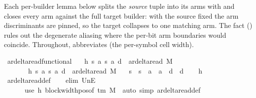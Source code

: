 \begin{isabellebody}
\begin{isamarkuptext}
  Each per-builder lemma below splits the \emph{source} tuple into its
  arms with  and closes every arm against the full target
  builder: with the source fixed the arm discriminants are pinned, so the
  target collapses to one matching arm.  The  fact
  () rules out the degenerate 
  aliasing where the per-bit arm boundaries would coincide.
  Throughout,  abbreviates  (the per-symbol cell width).%
\end{isamarkuptext}\isamarkuptrue%
\isamarkupfalse%
\ ar{\isacharunderscore}{\kern0pt}delta{\isacharunderscore}{\kern0pt}read{\isacharunderscore}{\kern0pt}functional{\isacharcolon}{\kern0pt}\isanewline
\ \ \ h{}{\isacharcolon}{\kern0pt}\ {\isachardoublequoteopen}{\isacharparenleft}{\kern0pt}s{\isacharcomma}{\kern0pt}\ a{\isacharcomma}{\kern0pt}\ s{}{\isacharcomma}{\kern0pt}\ a{}{\isacharcomma}{\kern0pt}\ d{}{\isacharparenright}{\kern0pt}\ {\isasymin}\ ar{\isacharunderscore}{\kern0pt}delta{\isacharunderscore}{\kern0pt}read\ M{\isachardoublequoteclose}\isanewline
\ \ \ \ \ \ \ h{}{\isacharcolon}{\kern0pt}\ {\isachardoublequoteopen}{\isacharparenleft}{\kern0pt}s{\isacharcomma}{\kern0pt}\ a{\isacharcomma}{\kern0pt}\ s{}{\isacharcomma}{\kern0pt}\ a{}{\isacharcomma}{\kern0pt}\ d{}{\isacharparenright}{\kern0pt}\ {\isasymin}\ ar{\isacharunderscore}{\kern0pt}delta{\isacharunderscore}{\kern0pt}read\ M{\isachardoublequoteclose}\isanewline
\ \ \ {\isachardoublequoteopen}s{}\ {\isacharequal}{\kern0pt}\ s{}\ {\isasymand}\ a{}\ {\isacharequal}{\kern0pt}\ a{}\ {\isasymand}\ d{}\ {\isacharequal}{\kern0pt}\ d{}{\isachardoublequoteclose}\isanewline
%
\isadelimproof
\ \ %
\endisadelimproof
%
\isatagproof
{}\isamarkupfalse%
\ h{}\ \isamarkupfalse%
\ ar{\isacharunderscore}{\kern0pt}delta{\isacharunderscore}{\kern0pt}read{\isacharunderscore}{\kern0pt}def\isanewline
\ \ \isamarkupfalse%
\ {\isacharparenleft}{\kern0pt}elim\ UnE{\isacharsemicolon}{\kern0pt}\isanewline
\ \ \ \ \ \ use\ h{}\ block{\isacharunderscore}{\kern0pt}width{\isacharunderscore}{\kern0pt}pos{\isacharbrackleft}{\kern0pt}of\ {\isachardoublequoteopen}{\isasymGamma}{\isacharunderscore}{\kern0pt}tm\ M{\isachardoublequoteclose}{\isacharbrackright}{\kern0pt}\ \ {\isacartoucheopen}auto\ simp{\isacharcolon}{\kern0pt}\ ar{\isacharunderscore}{\kern0pt}delta{\isacharunderscore}{\kern0pt}read{\isacharunderscore}{\kern0pt}def{\isacartoucheclose}{\isacharparenright}{\kern0pt}%

\end{isabellebody}
